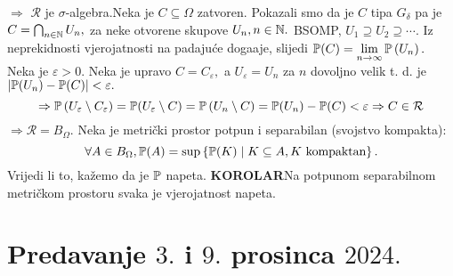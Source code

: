 \documentclass{article}
\begin{document}
\begin{itemize}
\end{itemize} \(\Rightarrow\) \(\mathcal R\) je \(\sigma\)-algebra.\newline Neka je \(C\subseteq\Omega\) zatvoren. Pokazali smo da je \(C\) tipa \(G_\delta\) pa je \(C=\bigcap_{n\in\Bbb N}U_n,\) za neke otvorene skupove \(U_n,n\in\Bbb N.\) BSOMP, \(U_1\supseteq U_2\supseteq\cdots.\) Iz neprekidnosti vjerojatnosti na padajuće doga\dj{}aje, slijedi \(\Bbb P(C)=\lim\limits_{n\to\infty}\Bbb P\left(U_n\right).\) Neka je \(\varepsilon>0.\) Neka je upravo \(C=C_\varepsilon,\) a \(U_\varepsilon=U_n\) za \(n\) dovoljno velik t. d. je \(\left|\Bbb P(U_n)-\Bbb P(C)\right|<\varepsilon.\) \[\Rightarrow\Bbb P\left(U_\varepsilon\setminus C_\varepsilon\right)=\Bbb P(U_\varepsilon\setminus C)=\Bbb P\left(U_n\setminus C\right)=\Bbb P(U_n)-\Bbb P(C)<\varepsilon\Rightarrow C\in\mathcal R\] \(\Rightarrow\mathcal R=B_\Omega.\)\newline\newline
Neka je metrički prostor potpun i separabilan (svojstvo kompakta): \[\forall A\in B_\Omega,\Bbb P(A)=\sup\left\{\Bbb P(K)\mid K\subseteq A, K\text{ kompaktan}\right\}.\] Vrijedi li to, kažemo da je \(\Bbb P\) napeta.\newline\newline
\textbf{KOROLAR}\newline Na potpunom separabilnom metričkom prostoru svaka je vjerojatnost napeta.
\section{Predavanje \(3.\) i \(9.\) prosinca \(2024.\)}
\end{document}
